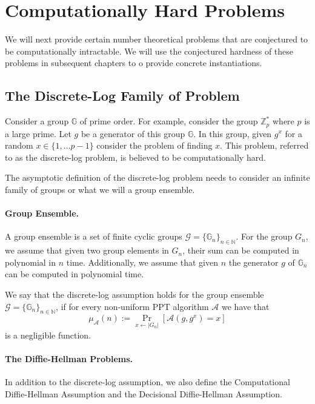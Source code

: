 \documentclass[12pt]{tufte-book}
\begin{document}
\section{Computationally  Hard Problems}\label{sec:assumptions}
We will next provide certain number theoretical problems that are conjectured to be computationally intractable. We will use the conjectured hardness of these problems in subsequent chapters to o provide concrete instantiations.

\subsection{The Discrete-Log Family of Problem}
Consider a group $\mathbb{G}$ of prime order. For example, consider the group $\mathbb{Z}_p^*$ where $p$ is a large prime. Let $g$ be a generator of this group $\mathbb{G}$. In this group, given $g^x$ for a random $x \in \{1,\ldots p-1\}$ consider the problem of finding $x$. This problem, referred to as the discrete-log problem, is believed to be computationally hard.

The asymptotic definition of the discrete-log problem needs to consider an infinite family of groups or what we will a group ensemble. 

\paragraph{Group Ensemble.} A group ensemble is a set of finite cyclic groups $\mathcal{G} =\{ \mathbb{G}_n\}_{n \in \mathbb{N}}$. For the group $G_n$, we assume that given two group elements in $G_n$, their sum can be computed in polynomial in $n$ time. Additionally, we assume that given $n$ the generator $g$ of $\mathbb{G}_n$ can be computed in polynomial time. 

\begin{definition}\label{def:dl}
We say that the discrete-log assumption holds for the group ensemble $\mathcal{G} =\{ \mathbb{G}_n\}_{n \in \mathbb{N}}$, if for every non-uniform PPT algorithm $\mathcal{A}$ we have that
\[\mu_\mathcal{A}(n) := \Pr_{x \leftarrow |G_n|}[\mathcal{A}(g,g^x) = x]\]
is a negligible function.
\end{definition}

\paragraph{The Diffie-Hellman Problems.} In addition to the discrete-log assumption, we also define the Computational Diffie-Hellman Assumption and the Decisional Diffie-Hellman Assumption. 
\end{document}
